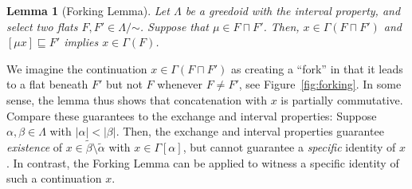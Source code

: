 \documentclass[11pt]{article}
\newtheorem{lemma}[theorem]{Lemma}
\newcommand{\glang}{\Lambda}
\begin{document}
\begin{lemma}[Forking Lemma]\label{lem:forking}
    Let $\glang$ be a greedoid with the interval property, and select two flats $F, F'\in\glang/\mathord{\sim}$.
    Suppose that $\mu \in F\sqcap F'$.
    Then, $x \in \Gamma(F\sqcap F')$ and $[\mu x] \sqsubseteq F'$ implies $x \in \Gamma(F)$.
\end{lemma}

We imagine the continuation $x\in\Gamma(F\sqcap F')$ as creating a ``fork'' in that it leads to a flat beneath $F'$ but not $F$ whenever $F\neq F'$, see Figure~\ref{fig:forking}.
In some sense, the lemma thus shows that concatenation with $x$ is partially commutative.
Compare these guarantees to the exchange and interval properties:
Suppose $\alpha, \beta \in \glang$ with $|\alpha| < |\beta|$.
Then, the exchange and interval properties guarantee \emph{existence} of $x \in\widetilde{\beta}\setminus \widetilde{\alpha}$ with $x\in\Gamma[\alpha]$, but cannot guarantee a \emph{specific} identity of $x$.
In contrast, the Forking Lemma can be applied to witness a specific identity of such a continuation $x$.
\end{document}
